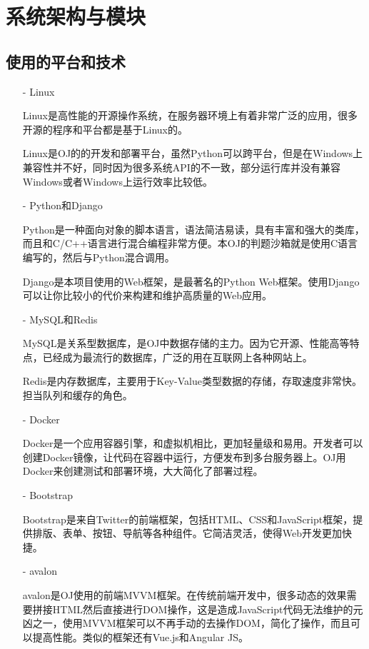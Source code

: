 \section{系统架构与模块}

\subsection{使用的平台和技术}

\begin{itemize}
\item[-]Linux
 
Linux是高性能的开源操作系统，在服务器环境上有着非常广泛的应用，很多开源的程序和平台都是基于Linux的。

Linux是OJ的的开发和部署平台，虽然Python可以跨平台，但是在Windows上兼容性并不好，同时因为很多系统API的不一致，部分运行库并没有兼容Windows或者Windows上运行效率比较低。

\item[-]Python和Django
 
Python是一种面向对象的脚本语言，语法简洁易读，具有丰富和强大的类库，而且和C/C++语言进行混合编程非常方便。本OJ的判题沙箱就是使用C语言编写的，然后与Python混合调用。

Django是本项目使用的Web框架，是最著名的Python Web框架。使用Django可以让你比较小的代价来构建和维护高质量的Web应用。
    
\item[-]MySQL和Redis
 
MySQL是关系型数据库，是OJ中数据存储的主力。因为它开源、性能高等特点，已经成为最流行的数据库，广泛的用在互联网上各种网站上。

Redis是内存数据库，主要用于Key-Value类型数据的存储，存取速度非常快。担当队列和缓存的角色。

\item[-]Docker
 
Docker是一个应用容器引擎，和虚拟机相比，更加轻量级和易用。开发者可以创建Docker镜像，让代码在容器中运行，方便发布到多台服务器上。OJ用Docker来创建测试和部署环境，大大简化了部署过程。

\item[-]Bootstrap

Bootstrap是来自Twitter的前端框架，包括HTML、CSS和JavaScript框架，提供排版、表单、按钮、导航等各种组件。它简洁灵活，使得Web开发更加快捷。

\item[-]avalon
 
avalon是OJ使用的前端MVVM框架。在传统前端开发中，很多动态的效果需要拼接HTML然后直接进行DOM操作，这是造成JavaScript代码无法维护的元凶之一，使用MVVM框架可以不再手动的去操作DOM，简化了操作，而且可以提高性能。类似的框架还有Vue.js和Angular JS。
    

\end{itemize}
